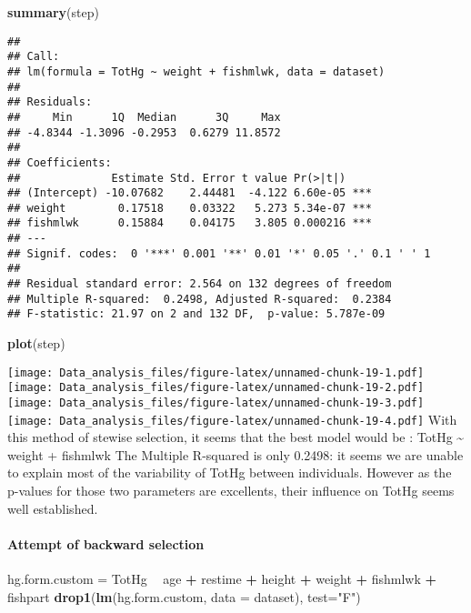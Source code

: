 \documentclass[12pt,]{article}
\newenvironment{Shaded}{\begin{snugshade}}{\end{snugshade}}
\newcommand{\KeywordTok}[1]{\textcolor[rgb]{0.13,0.29,0.53}{\textbf{#1}}}
\newcommand{\DataTypeTok}[1]{\textcolor[rgb]{0.13,0.29,0.53}{#1}}
\newcommand{\StringTok}[1]{\textcolor[rgb]{0.31,0.60,0.02}{#1}}
\newcommand{\OperatorTok}[1]{\textcolor[rgb]{0.81,0.36,0.00}{\textbf{#1}}}
\newcommand{\NormalTok}[1]{#1}
\let\oldparagraph\paragraph
\renewcommand{\paragraph}[1]{\oldparagraph{#1}\mbox{}}
\begin{document}
\begin{Shaded}
\begin{Highlighting}[]
\KeywordTok{summary}\NormalTok{(step)}
\end{Highlighting}
\end{Shaded}

\begin{verbatim}
## 
## Call:
## lm(formula = TotHg ~ weight + fishmlwk, data = dataset)
## 
## Residuals:
##     Min      1Q  Median      3Q     Max 
## -4.8344 -1.3096 -0.2953  0.6279 11.8572 
## 
## Coefficients:
##              Estimate Std. Error t value Pr(>|t|)    
## (Intercept) -10.07682    2.44481  -4.122 6.60e-05 ***
## weight        0.17518    0.03322   5.273 5.34e-07 ***
## fishmlwk      0.15884    0.04175   3.805 0.000216 ***
## ---
## Signif. codes:  0 '***' 0.001 '**' 0.01 '*' 0.05 '.' 0.1 ' ' 1
## 
## Residual standard error: 2.564 on 132 degrees of freedom
## Multiple R-squared:  0.2498, Adjusted R-squared:  0.2384 
## F-statistic: 21.97 on 2 and 132 DF,  p-value: 5.787e-09
\end{verbatim}

\begin{Shaded}
\begin{Highlighting}[]
\KeywordTok{plot}\NormalTok{(step)}
\end{Highlighting}
\end{Shaded}

\texttt{[image: Data\_analysis\_files/figure-latex/unnamed-chunk-19-1.pdf]}
\texttt{[image: Data\_analysis\_files/figure-latex/unnamed-chunk-19-2.pdf]}
\texttt{[image: Data\_analysis\_files/figure-latex/unnamed-chunk-19-3.pdf]}
\texttt{[image: Data\_analysis\_files/figure-latex/unnamed-chunk-19-4.pdf]}
With this method of stewise selection, it seems that the best model
would be : TotHg \textasciitilde{} weight + fishmlwk The Multiple
R-squared is only 0.2498: it seems we are unable to explain most of the
variability of TotHg between individuals. However as the p-values for
those two parameters are excellents, their influence on TotHg seems well
established.

\paragraph{Attempt of backward
selection}\label{attempt-of-backward-selection}

\begin{Shaded}
\begin{Highlighting}[]
\NormalTok{hg.form.custom =}\StringTok{ }\NormalTok{TotHg }\OperatorTok{~}\StringTok{ }\NormalTok{age }\OperatorTok{+}\StringTok{ }\NormalTok{restime }\OperatorTok{+}\StringTok{ }\NormalTok{height }\OperatorTok{+}\StringTok{ }\NormalTok{weight }\OperatorTok{+}\StringTok{ }\NormalTok{fishmlwk }\OperatorTok{+}\StringTok{ }\NormalTok{fishpart}
\KeywordTok{drop1}\NormalTok{(}\KeywordTok{lm}\NormalTok{(hg.form.custom, }\DataTypeTok{data =}\NormalTok{ dataset), }\DataTypeTok{test=}\StringTok{"F"}\NormalTok{)}
\end{Highlighting}
\end{Shaded}
\end{document}
